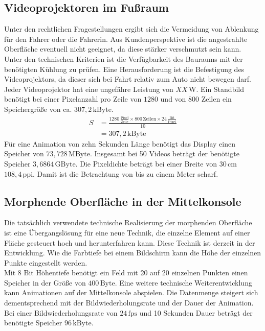 \subsection{Videoprojektoren im Fußraum}
Unter den rechtlichen Fragestellungen ergibt sich die Vermeidung von Ablenkung für den Fahrer oder die Fahrerin.
Aus Kundenperspektive ist die angestrahlte Oberfläche eventuell nicht geeignet, da diese stärker verschmutzt sein kann. \\
Unter den technischen Kriterien ist die Verfügbarkeit des Bauraums mit der benötigten Kühlung zu prüfen. Eine Herausforderung ist die Befestigung des Videoprojektors, da dieser sich bei Fahrt relativ zum Auto nicht bewegen darf.
Jeder Videoprojektor hat eine ungefähre Leistung von $ XX\,\mathrm{W} $. 
Ein Standbild benötigt bei einer Pixelanzahl pro Zeile von $ 1280 $ und von $ 800 $ Zeilen ein Speichergröße von ca. $ 307,2\,\mathrm{kByte}$. 
\begin{align}
	S &= \frac{1280\,\frac{\mathrm{Pixel}}{\mathrm{Zeile}}\times 800\,\mathrm{Zeilen} \times 24\,\frac{\mathrm{Bit}}{\mathrm{Pixel}}}{10} \\
	&= 307,2\,\mathrm{kByte}
\end{align}
Für eine Animation von zehn Sekunden Länge benötigt das Display einen Speicher von $ 73,728\,\mathrm{MByte}$.
Insgesamt bei 50 Videos beträgt der benötigte Speicher $ 3,6864\,\mathrm{GByte}$.
Die Pixeldichte beträgt bei einer Breite von $ 30\,\mathrm{cm} $ $ 108,4\,\mathrm{ppi} $. Damit ist die Betrachtung von bis zu einem Meter scharf.
\subsection{Morphende Oberfläche in der Mittelkonsole}
Die tatsächlich verwendete technische Realisierung der morphenden Oberfläche ist eine Übergangslösung für eine neue Technik, die einzelne Element auf einer Fläche gesteuert hoch und herunterfahren kann. Diese Technik ist derzeit in der Entwicklung. Wie die Farbtiefe bei einem Bildschirm kann die Höhe der einzelnen Punkte eingestellt werden. \\
Mit 8 Bit Höhentiefe benötigt ein Feld mit 20 auf 20 einzelnen Punkten einen Speicher in der Größe von $ 400\,\mathrm{Byte}$.
Eine weitere technische Weiterentwicklung kann Animationen auf der Mittelkonsole abspielen. Die Datenmenge steigert sich dementsprechend mit der Bildwiederholungsrate und der Dauer der Animation. Bei einer Bildwiederholungsrate von $ 24\,\mathrm{fps} $ und 10 Sekunden Dauer beträgt der benötigte Speicher $ 96\,\mathrm{kByte}$.
